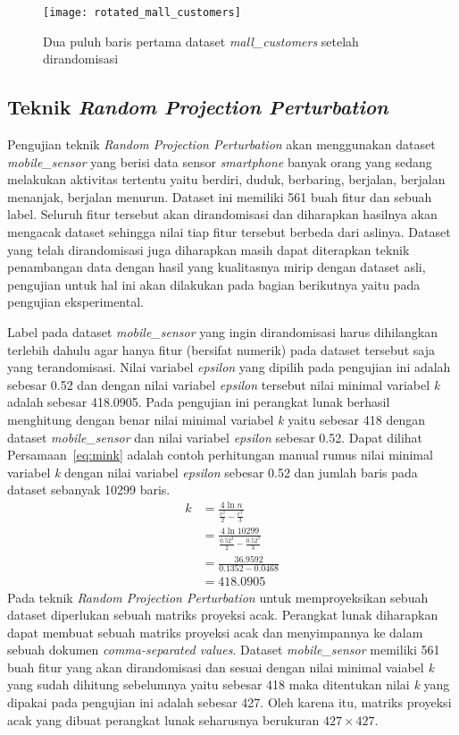 \begin{figure}
	\centering
	\texttt{[image: rotated\_mall\_customers]}
	\caption{Dua puluh baris pertama dataset \textit{mall\_customers} setelah dirandomisasi}
	\label{fig:rotated_mall_customers}
\end{figure}

\subsection{Teknik \textit{Random Projection Perturbation}}
\label{subsec:rpp-fungsional}

Pengujian teknik \textit{Random Projection Perturbation} akan menggunakan dataset \textit{mobile\_sensor} yang berisi data sensor \textit{smartphone} banyak orang yang sedang melakukan aktivitas tertentu yaitu berdiri, duduk, berbaring, berjalan, berjalan menanjak, berjalan menurun. Dataset ini memiliki 561 buah fitur dan sebuah label. Seluruh fitur tersebut akan dirandomisasi dan diharapkan hasilnya akan mengacak dataset sehingga nilai tiap fitur tersebut berbeda dari aslinya. Dataset yang telah dirandomisasi juga diharapkan masih dapat diterapkan teknik penambangan data dengan hasil yang kualitasnya mirip dengan dataset asli, pengujian untuk hal ini akan dilakukan pada bagian berikutnya yaitu pada pengujian eksperimental.

Label pada dataset \textit{mobile\_sensor} yang ingin dirandomisasi harus dihilangkan terlebih dahulu agar hanya fitur (bersifat numerik) pada dataset tersebut saja yang terandomisasi. Nilai variabel \textit{epsilon} yang dipilih pada pengujian ini adalah sebesar 0.52 dan dengan nilai variabel \textit{epsilon} tersebut nilai minimal variabel \textit{k} adalah sebesar 418.0905. Pada pengujian ini perangkat lunak berhasil menghitung dengan benar nilai minimal variabel \textit{k} yaitu sebesar 418 dengan dataset \textit{mobile\_sensor} dan nilai variabel \textit{epsilon} sebesar 0.52. Dapat dilihat Persamaan~\ref{eq:mink} adalah contoh perhitungan manual rumus nilai minimal variabel \textit{k} dengan nilai variabel \textit{epsilon} sebesar 0.52 dan jumlah baris pada dataset sebanyak 10299 baris.
\begin{align}
	k &= \frac{4\ln{n}}{\frac{\epsilon^{2}}{2}-\frac{\epsilon^{3}}{3}} \label{eq:mink} \\
	&= \frac{4\ln{10299}}{\frac{0.52^{2}}{2}-\frac{0.52^{3}}{3}} \nonumber \\
	&= \frac{36.9592}{0.1352-0.0468} \nonumber \\
	&= 418.0905 \nonumber
\end{align}
Pada teknik \textit{Random Projection Perturbation} untuk memproyeksikan sebuah dataset diperlukan sebuah matriks proyeksi acak. Perangkat lunak diharapkan dapat membuat sebuah matriks proyeksi acak dan menyimpannya ke dalam sebuah dokumen \textit{comma-separated values}. Dataset \textit{mobile\_sensor} memiliki 561 buah fitur yang akan dirandomisasi dan sesuai dengan nilai minimal vaiabel \textit{k} yang sudah dihitung sebelumnya yaitu sebesar 418 maka ditentukan nilai \textit{k} yang dipakai pada pengujian ini adalah sebesar 427. Oleh karena itu, matriks proyeksi acak yang dibuat perangkat lunak seharusnya berukuran \(427\times427\).

